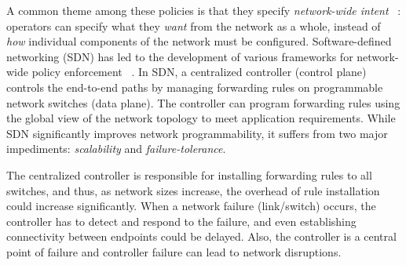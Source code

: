 
A common theme among these policies is that they specify
\emph{network-wide intent}~\cite{intent}
: operators can specify what
they \emph{want} from the network as a whole, instead of \emph{how}
individual components of the network must be configured.
Software-defined networking (SDN) has led to the development of
various frameworks for network-wide policy enforcement ~\cite{netkat,
  simple, merlin, fattire, genesis}. In SDN, a centralized controller
(control plane) controls the end-to-end paths by managing forwarding
rules on programmable network switches (data plane). The controller
can program forwarding rules using the global view of the network
topology to meet application requirements. While SDN significantly
improves network programmability, it suffers from two major
impediments: \emph{scalability} and \emph{failure-tolerance}.

The centralized controller is responsible for installing 
forwarding rules to all switches, and thus, as network sizes
increase, the overhead of rule installation could increase
significantly. When a network failure (link/switch) occurs,
the controller has to detect and respond to the failure, and
even establishing connectivity between endpoints could be delayed.
Also, the controller is a central point of failure and controller
failure can lead to network disruptions. 

